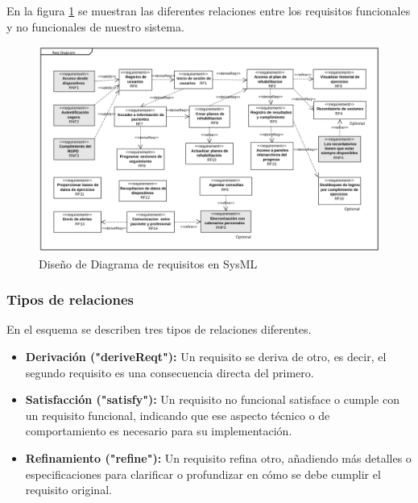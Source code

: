 \documentclass{article}
\begin{document}
En la figura \ref{fig:SysML} se muestran las diferentes relaciones entre los requisitos funcionales y no funcionales de nuestro sistema.

\begin{figure}
	\begin{center} 
		\includegraphics[width=1\textwidth]{images/SysML.png}
		\caption{Diseño de Diagrama de requisitos en SysML}
		\label{fig:SysML}
	\end{center}
\end{figure}


\subsubsection{Tipos de relaciones}
En el esquema se describen tres tipos de relaciones diferentes.

\begin{itemize}
	\item \textbf{Derivación ("deriveReqt"):} Un requisito se deriva de otro, es decir, el segundo requisito es una consecuencia directa del primero.
	\item \textbf{Satisfacción ("satisfy"):} Un requisito no funcional satisface o cumple con un requisito funcional, indicando que ese aspecto técnico o de comportamiento es necesario para su implementación.
	\item \textbf{Refinamiento ("refine"):} Un requisito refina otro, añadiendo más detalles o especificaciones para clarificar o profundizar en cómo se debe cumplir el requisito original.
\end{itemize}
\end{document}
